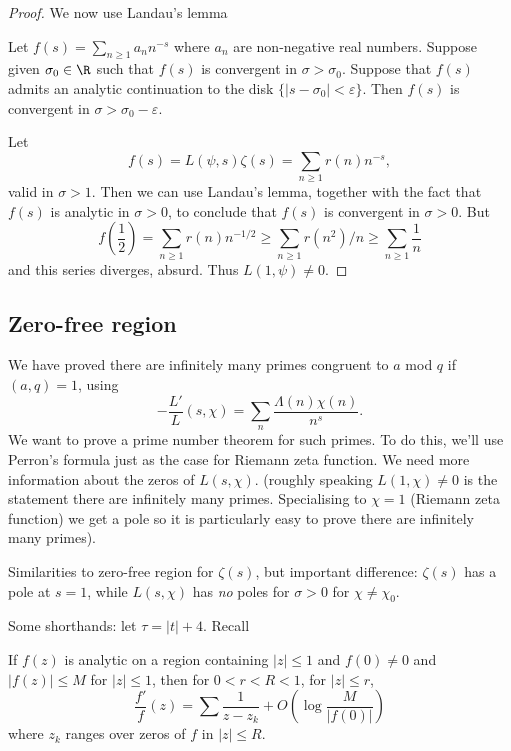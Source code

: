 \documentclass[a4paper]{article}
\theoremstyle{definition}
\begin{document}
\begin{proof}
  We now use Landau's lemma
  \begin{lemma}
    Let \(f(s) = \sum_{n \geq 1} a_n n^{-s}\) where \(a_n\) are non-negative real numbers. Suppose given \(\sigma_0 \in \R\) such that \(f(s)\) is convergent in \(\sigma > \sigma_0\). Suppose that \(f(s)\) admits an analytic continuation to the disk \(\{|s - \sigma_0| < \varepsilon\}\). Then \(f(s)\) is convergent in \(\sigma > \sigma_0 - \varepsilon\).
  \end{lemma}
  Let
  \[
    f(s) = L(\psi, s) \zeta(s) = \sum_{n \geq 1} r(n)n^{-s},
  \]
  valid in \(\sigma > 1\). Then we can use Landau's lemma, together with the fact that \(f(s)\) is analytic in \(\sigma > 0\), to conclude that \(f(s)\) is convergent in \(\sigma > 0\). But
  \[
    f\left(\frac{1}{2}\right)
    = \sum_{n \geq 1} r(n) n^{-1/2} \geq \sum_{n \geq 1} r(n^2)/n 
    \geq \sum_{n \geq 1} \frac{1}{n}
  \]
  and this series diverges, absurd. Thus \(L(1, \psi) \neq 0\).
\end{proof}

\subsection{Zero-free region}

We have proved there are infinitely many primes congruent to \(a\) mod \(q\) if \((a, q) = 1\), using
\[
  -\frac{L'}{L}(s, \chi) = \sum_n \frac{\Lambda(n) \chi(n)}{n^s}.
\]
We want to prove a prime number theorem for such primes. To do this, we'll use Perron's formula just as the case for Riemann zeta function. We need more information about the zeros of \(L(s, \chi)\). (roughly speaking \(L(1, \chi) \neq 0\) is the statement there are infinitely many primes. Specialising to \(\chi = 1\) (Riemann zeta function) we get a pole so it is particularly easy to prove there are infinitely many primes).

Similarities to zero-free region for \(\zeta(s)\), but important difference: \(\zeta(s)\) has a pole at \(s = 1\), while \(L(s, \chi)\) has \emph{no} poles for \(\sigma > 0\) for \(\chi \neq \chi_0\).

Some shorthands: let \(\tau = |t| + 4\). Recall
\begin{lemma}
  If \(f(z)\) is analytic on a region containing \(|z| \leq 1\) and \(f(0) \neq 0\) and \(|f(z)| \leq M\) for \(|z| \leq 1\), then for \(0 < r < R < 1\), for \(|z| \leq r\),
  \[
    \frac{f'}{f}(z) = \sum \frac{1}{z - z_k} + O(\log \frac{M}{|f(0)|})
  \]
  where \(z_k\) ranges over zeros of \(f\) in \(|z| \leq R\).
\end{lemma}
\end{document}

